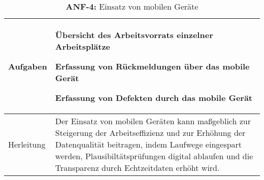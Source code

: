 \begin{table}[H]
	\centering
	\begin{tabularx}{\textwidth}{|l|X|} 
        \hline
		Aufgaben &   
		\begin{minipage}{4.8in}
    		\begin{compactenum}
        		\renewcommand{\labelenumi}{(\arabic{enumi})}
        		\item Übersicht des Arbeitsvorrats einzelner Arbeitsplätze 
        		\item Erfassung von Rückmeldungen über das mobile Gerät
        		\item Erfassung von Defekten durch das mobile Gerät
    		\end{compactenum}
    		\vspace{1pt}		
		\end{minipage} \\
		\hline\hline
		Herleitung                                        &   
		Der Einsatz von mobilen Geräten kann maßgeblich zur Steigerung der Arbeitseffizienz und zur Erhöhung der Datenqualität beitragen, indem Laufwege eingespart werden, Plausibiltätsprüfungen digital ablaufen und die Transparenz durch Echtzeitdaten erhöht wird.\\
		\hline
	\end{tabularx}
	\caption{\label{tab:anf1}\textbf{ANF-4:} Einsatz von mobilen Geräte}
\end{table}